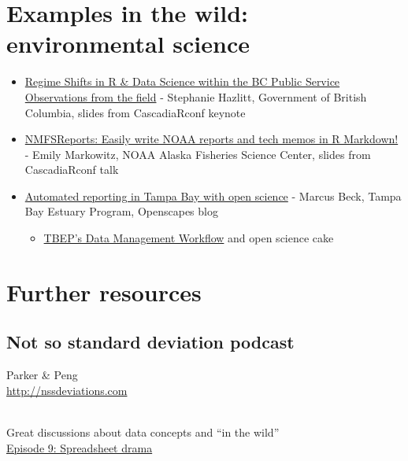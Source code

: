 \documentclass[
  letterpaper,
  DIV=11,
  numbers=noendperiod]{scrreprt}
\providecommand{\tightlist}{%
  \setlength{\itemsep}{0pt}\setlength{\parskip}{0pt}}
\begin{document}
\hypertarget{examples-in-the-wild-environmental-science}{%
\section{Examples in the wild: environmental
science}\label{examples-in-the-wild-environmental-science}}

\begin{itemize}
\tightlist
\item
  \href{https://stephhazlitt.github.io/regime-shifts/slides\#1}{Regime
  Shifts in R \& Data Science within the BC Public Service Observations
  from the field} - Stephanie Hazlitt, Government of British Columbia,
  slides from CascadiaRconf keynote
\item
  \href{https://github.com/EmilyMarkowitz-NOAA/NMFSReports/blob/main/presentations/2021-06-05\%20NMFSReports\%20-\%20R\%20Cascadia\%20Conf.pdf}{NMFSReports:
  Easily write NOAA reports and tech memos in R Markdown!} - Emily
  Markowitz, NOAA Alaska Fisheries Science Center, slides from
  CascadiaRconf talk
\item
  \href{https://www.openscapes.org/blog/2020/11/16/tampa-bay-reporting/}{Automated
  reporting in Tampa Bay with open science} - Marcus Beck, Tampa Bay
  Estuary Program, Openscapes blog

  \begin{itemize}
  \tightlist
  \item
    \href{https://tbep-tech.github.io/data-management-sop/workflow.html}{TBEP's
    Data Management Workflow} and open science cake
  \end{itemize}
\end{itemize}

\hypertarget{further-resources}{%
\section{Further resources}\label{further-resources}}

\hypertarget{not-so-standard-deviation-podcast}{%
\subsection{Not so standard deviation
podcast}\label{not-so-standard-deviation-podcast}}

Parker \& Peng\\
\url{http://nssdeviations.com}\strut \\
Great discussions about data concepts and ``in the wild''\\
\href{http://nssdeviations.com/episode-9-spreadsheet-drama}{Episode 9:
Spreadsheet drama}
\end{document}
